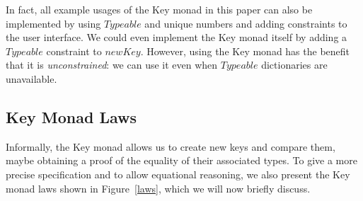 \documentclass{sigplanconf}
\newcommand{\Conid}[1]{\mathit{#1}}
\newcommand{\Varid}[1]{\mathit{#1}}
\begin{document}
In fact, all example usages of the Key monad in this paper can also be implemented by using \ensuremath{\Conid{Typeable}} and unique numbers and adding constraints to the user interface. We could even implement the Key monad itself by adding a \ensuremath{\Conid{Typeable}} constraint to \ensuremath{\Varid{newKey}}. However, using the Key monad has the benefit that it is \emph{unconstrained}: we can use it even when \ensuremath{\Conid{Typeable}} dictionaries are unavailable.

\subsection{Key Monad Laws}
\label{seclaws}
Informally, the Key monad allows us to create new keys and compare them, maybe obtaining a proof of the equality of their associated types. To give a more precise specification and to allow equational reasoning, we also present the Key monad laws shown in Figure~\ref{laws}, which we will now briefly discuss. 
\end{document}
